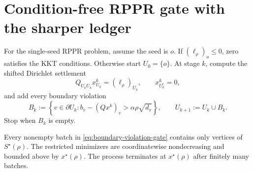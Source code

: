 \section{Condition-free RPPR gate with the sharper ledger}
\label{sec:rppr-gate}

For the single-seed RPPR problem, assume the seed is $o$.  If
$(\ell_\rho)_o\leq0$, zero satisfies the KKT conditions.  Otherwise start
$U_0=\{o\}$.  At stage $k$, compute the shifted Dirichlet settlement
\begin{equation}
 Q_{U_kU_k}x^k_{U_k}=(\ell_\rho)_{U_k},
 \qquad x^k_{U_k^c}=0,
 \label{eq:restricted-rppr-settlement}
\end{equation}
and add every boundary violation
\begin{equation}
 B_k:=\left\{
  v\in\partial U_k:
  b_v-(Qx^k)_v>\alpha\rho\sqrt{d_v}
 \right\},
 \qquad U_{k+1}:=U_k\cup B_k.
 \label{eq:boundary-violation-gate}
\end{equation}
Stop when $B_k$ is empty.

\begin{theorem}
\label{thm:safe-boundary-expansion}
Every nonempty batch in \cref{eq:boundary-violation-gate} contains only
vertices of $S^\star(\rho)$.  The restricted minimizers are coordinatewise
nondecreasing and bounded above by $x^\star(\rho)$.  The process terminates
at $x^\star(\rho)$ after finitely many batches.
\end{theorem}


